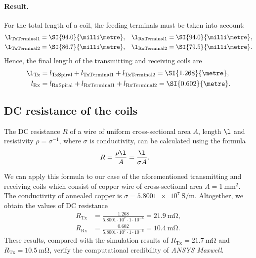 \documentclass[11pt,a4paper,twoside,openany]{report}
\begin{document}
            \paragraph{Result.} For the total length of a coil, the feeding terminals must be taken into account:
            \begin{align}
                \l_{\mathrm{TxTerminal1}} &= \SI{94.0}{\milli\metre},
            &
                \l_{\mathrm{RxTerminal1}} &= \SI{94.0}{\milli\metre},
            \\
                \l_{\mathrm{TxTerminal2}} &= \SI{86.7}{\milli\metre},
            &
                \l_{\mathrm{RxTerminal2}} &= \SI{79.5}{\milli\metre}.
            \end{align}
            Hence, the final length of the transmitting and receiving coils are
            \begin{align}
                \l_{\mathrm{Tx}} &= l_{\mathrm{TxSpiral}} + l_{\mathrm{TxTerminal1}} + l_{\mathrm{TxTerminal2}} = \SI{1.268}{\metre},
            \\
                l_{\mathrm{Rx}} &= l_{\mathrm{RxSpiral}} + l_{\mathrm{RxTerminal1}} + l_{\mathrm{RxTerminal2}} = \SI{0.602}{\metre}.
            \end{align}

        \subsection{DC resistance of the coils}
            The DC resistance $R$ of a wire of uniform cross-sectional area $A$, length $\l$ and resistivity $\rho = \sigma^{-1}$, where $\sigma$ is conductivity, can be calculated using the formula
            \begin{align}
                R &= \frac{\rho \l}{A} = \frac{\l}{\sigma A}.
            \end{align}

            We can apply this formula to our case of the aforementioned transmitting and receiving coils which consist of copper wire of cross-sectional area $A = \SI{1}{\milli\metre\squared}$. The conductivity of annealed copper is $\sigma = \SI{5.8001e7}{\siemens\per\metre}$. Altogether, we obtain the values of DC resistance
            \begin{align}
                R_{\mathrm{Tx}} &= \frac{1.268}{5.8001 \cdot 10^7 \cdot 1 \cdot 10^{-6}} = \SI{21.9}{\milli\ohm},
            \\
                R_{\mathrm{Rx}} &= \frac{0.602}{5.8001 \cdot 10^7 \cdot 1 \cdot 10^{-6}} = \SI{10.4}{\milli\ohm}.
            \end{align}
            These results, compared with the simulation results of $R_{\mathrm{Tx}} = \SI{21.7}{\milli\ohm}$ and $R_{\mathrm{Tx}} = \SI{10.5}{\milli\ohm}$, verify the computational credibility of \emph{ANSYS Maxwell}.
    
\end{document}

